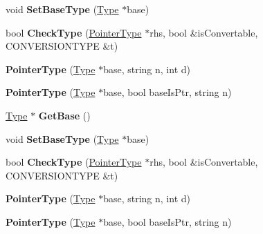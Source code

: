 \begin{DoxyCompactItemize}
\item 
\hypertarget{classPointerType_abfb4082aafcedbe8660cfadabbe79f18}{void {\bfseries Set\-Base\-Type} (\hyperlink{classType}{Type} $\ast$base)}\label{classPointerType_abfb4082aafcedbe8660cfadabbe79f18}

\item 
\hypertarget{classPointerType_a01b7271726a3f891c9556cbbab3a4410}{bool {\bfseries Check\-Type} (\hyperlink{classPointerType}{Pointer\-Type} $\ast$rhs, bool \&is\-Convertable, C\-O\-N\-V\-E\-R\-S\-I\-O\-N\-T\-Y\-P\-E \&t)}\label{classPointerType_a01b7271726a3f891c9556cbbab3a4410}

\item 
\hypertarget{classPointerType_acb7c1bf4a82371e46d133a1471d1e3f3}{{\bfseries Pointer\-Type} (\hyperlink{classType}{Type} $\ast$base, string n, int d)}\label{classPointerType_acb7c1bf4a82371e46d133a1471d1e3f3}

\item 
\hypertarget{classPointerType_a58dbecb35ecd7ba2901db09aba00dcc7}{{\bfseries Pointer\-Type} (\hyperlink{classType}{Type} $\ast$base, bool base\-Is\-Ptr, string n)}\label{classPointerType_a58dbecb35ecd7ba2901db09aba00dcc7}

\item 
\hypertarget{classPointerType_acfdee349a0e18abd304f85d0b6d951ff}{\hyperlink{classType}{Type} $\ast$ {\bfseries Get\-Base} ()}\label{classPointerType_acfdee349a0e18abd304f85d0b6d951ff}

\item 
\hypertarget{classPointerType_abfb4082aafcedbe8660cfadabbe79f18}{void {\bfseries Set\-Base\-Type} (\hyperlink{classType}{Type} $\ast$base)}\label{classPointerType_abfb4082aafcedbe8660cfadabbe79f18}

\item 
\hypertarget{classPointerType_a01b7271726a3f891c9556cbbab3a4410}{bool {\bfseries Check\-Type} (\hyperlink{classPointerType}{Pointer\-Type} $\ast$rhs, bool \&is\-Convertable, C\-O\-N\-V\-E\-R\-S\-I\-O\-N\-T\-Y\-P\-E \&t)}\label{classPointerType_a01b7271726a3f891c9556cbbab3a4410}

\item 
\hypertarget{classPointerType_acb7c1bf4a82371e46d133a1471d1e3f3}{{\bfseries Pointer\-Type} (\hyperlink{classType}{Type} $\ast$base, string n, int d)}\label{classPointerType_acb7c1bf4a82371e46d133a1471d1e3f3}

\item 
\hypertarget{classPointerType_a58dbecb35ecd7ba2901db09aba00dcc7}{{\bfseries Pointer\-Type} (\hyperlink{classType}{Type} $\ast$base, bool base\-Is\-Ptr, string n)}\label{classPointerType_a58dbecb35ecd7ba2901db09aba00dcc7}


\end{DoxyCompactItemize}

